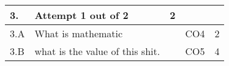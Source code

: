 \documentclass[12pt]{article}
\begin{document}
\begin{longtable}{|L{1cm}|L{8cm}|C{1cm}|C{1cm}|C{1cm}|}\hline
	\bf3. & \bf{Attempt} \bf{1} \bf{out of} \bf{2} & \bf{2}  & & \\ \hline





		3.A &
	What is mathematic \newline
			
	 &   & CO4 & 2\\ \hline
		3.B &
	what is the value of this shit. \newline
			
	 &   & CO5 & 4\\ \hline
	\end{longtable}
\end{document}
